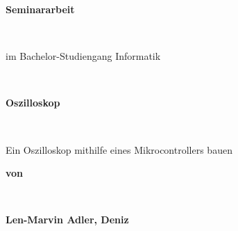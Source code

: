 \begin{titlepage}
\begin{Large}
\begin{flushleft}
\end{flushleft} 
\end{Large}

\vspace{0.150\textheight}
\begin{center}
 \begin{Huge} \textbf{Seminararbeit} \end{Huge}\\
 \vspace{2em}
 \begin{Large} im Bachelor-Studiengang Informatik \end{Large}
 \vspace{0.10\textheight}\\
 \begin{Huge} \textbf{Oszilloskop} \end{Huge}\\
 \vspace{1em}
 \begin{Large}Ein Oszilloskop mithilfe eines Mikrocontrollers bauen\end{Large}

 \vspace{2em}
 \begin{Large}\textbf{von} \end{Large}\\
 \vspace{1em}
 \begin{Large}\textbf{Len-Marvin Adler, Deniz}\end{Large}\\
\end{center}
\vspace{0.100\textheight}


\end{titlepage}
